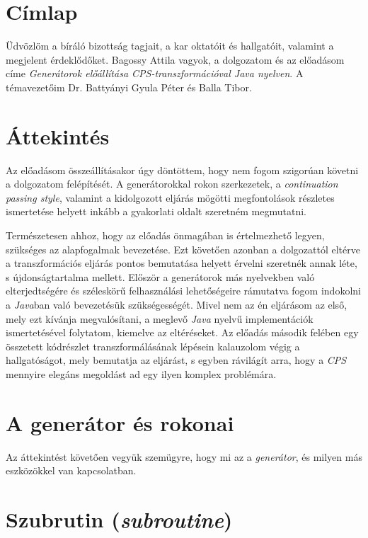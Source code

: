 \documentclass[12pt, a4paper]{article}
\begin{document}
\setcounter{section}{-1}
\section{Címlap}
Üdvözlöm a bíráló bizottság tagjait, a kar oktatóit és hallgatóit, valamint a megjelent érdeklődőket. Bagossy Attila vagyok, a dolgozatom és az előadásom címe \textit{Generátorok előállítása CPS-transzformációval Java nyelven}. A témavezetőim Dr. Battyányi Gyula Péter és Balla Tibor.

\section{Áttekintés}
Az előadásom összeállításakor úgy döntöttem, hogy nem fogom szigorúan követni a dolgozatom felépítését. A generátorokkal rokon szerkezetek, a \textit{continuation passing style}, valamint a kidolgozott eljárás mögötti megfontolások részletes ismertetése helyett inkább a gyakorlati oldalt szeretném megmutatni. 

Természetesen ahhoz, hogy az előadás önmagában is értelmezhető legyen, szükséges az alapfogalmak bevezetése. Ezt követően azonban a dolgozattól eltérve a transzformációs eljárás pontos bemutatása helyett érvelni szeretnék annak léte, s újdonságtartalma mellett. Először a generátorok más nyelvekben való elterjedtségére és széleskörű felhasználási lehetőségeire rámutatva fogom indokolni a \textit{Java}ban való bevezetésük szükségességét. Mivel nem az én eljárásom az első, mely ezt kívánja megvalósítani, a meglevő \textit{Java} nyelvű implementációk ismertetésével folytatom, kiemelve az eltéréseket. Az előadás második felében egy összetett kódrészlet transzformálásának lépésein kalauzolom végig a hallgatóságot, mely bemutatja az eljárást, s egyben rávilágít arra, hogy a \textit{CPS} mennyire elegáns megoldást ad egy ilyen komplex problémára.

\section{A generátor és rokonai}

Az áttekintést követően vegyük szemügyre, hogy mi az a \textit{generátor}, és milyen más eszközökkel van kapcsolatban.

\section{Szubrutin (\textit{subroutine})}
\end{document}
